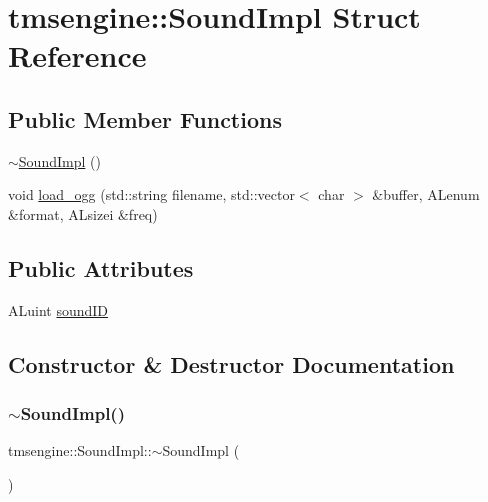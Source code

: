 \hypertarget{structtmsengine_1_1_sound_impl}{}\section{tmsengine\+:\+:Sound\+Impl Struct Reference}
\label{structtmsengine_1_1_sound_impl}
\subsection*{Public Member Functions}
\begin{DoxyCompactItemize}
\item 
\hyperlink{structtmsengine_1_1_sound_impl_a96a5387f2e92cd9f856874babc825ac7}{$\sim$\+Sound\+Impl} ()
\item 
void \hyperlink{structtmsengine_1_1_sound_impl_a1995d7987e588d66baa614381d0613da}{load\+\_\+ogg} (std\+::string filename, std\+::vector$<$ char $>$ \&buffer, A\+Lenum \&format, A\+Lsizei \&freq)
\end{DoxyCompactItemize}
\subsection*{Public Attributes}
\begin{DoxyCompactItemize}
\item 
A\+Luint \hyperlink{structtmsengine_1_1_sound_impl_a2d9069b4af77273e7bfe07f063486244}{sound\+ID}
\end{DoxyCompactItemize}


\subsection{Constructor \& Destructor Documentation}
\mbox{\label{structtmsengine_1_1_sound_impl_a96a5387f2e92cd9f856874babc825ac7}} 
\subsubsection{\texorpdfstring{$\sim$\+Sound\+Impl()}{~SoundImpl()}}
{\footnotesize\ttfamily tmsengine\+::\+Sound\+Impl\+::$\sim$\+Sound\+Impl (\begin{DoxyParamCaption}{ }\end{DoxyParamCaption})\hspace{0.3cm}{\ttfamily [inline]}}



